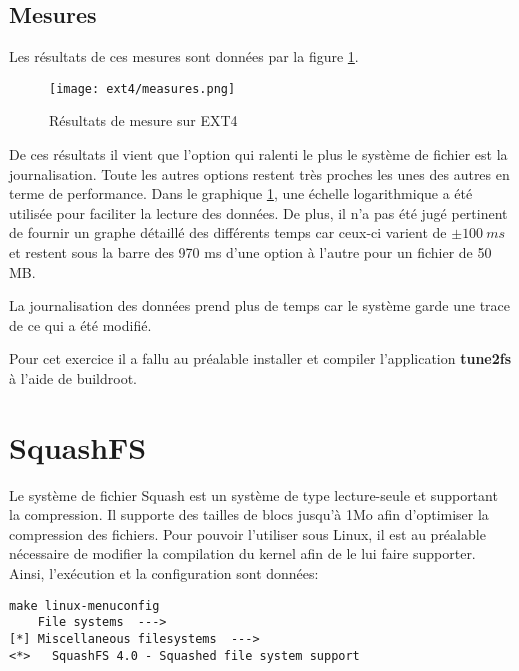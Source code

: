 \subsection{Mesures}
Les résultats de ces mesures sont données par la figure \ref{fig:measure ext4}.
\begin{figure}[H]
	\centering
	\texttt{[image: ext4/measures.png]}
	\caption{\label{fig:measure ext4}Résultats de mesure sur EXT4}
\end{figure}

De ces résultats il vient que l'option qui ralenti le plus le système de fichier est la journalisation. Toute les autres options restent très proches les unes des autres en terme de performance. Dans le graphique \ref{fig:measure ext4}, une échelle logarithmique a été utilisée pour faciliter la lecture des données. De plus, il n'a pas été jugé pertinent de fournir un graphe détaillé des différents temps car ceux-ci varient de $\pm 100\ ms$ et restent sous la barre des 970 ms d'une option à l'autre pour un fichier de 50 MB.

La journalisation des données prend plus de temps car le système garde une trace de ce qui a été modifié.

Pour cet exercice il a fallu au préalable installer et compiler l'application \textbf{tune2fs} à l'aide de buildroot.

\section{SquashFS}
Le système de fichier Squash est un système de type lecture-seule et supportant la compression. Il supporte des tailles de blocs jusqu'à 1Mo afin d'optimiser la compression des fichiers. Pour pouvoir l'utiliser sous Linux, il est au préalable nécessaire de modifier la compilation du kernel afin de le lui faire supporter. Ainsi, l'exécution et la configuration sont données:

\begin{lstlisting}
make linux-menuconfig
    File systems  --->
[*] Miscellaneous filesystems  --->
<*>   SquashFS 4.0 - Squashed file system support
\end{lstlisting}


